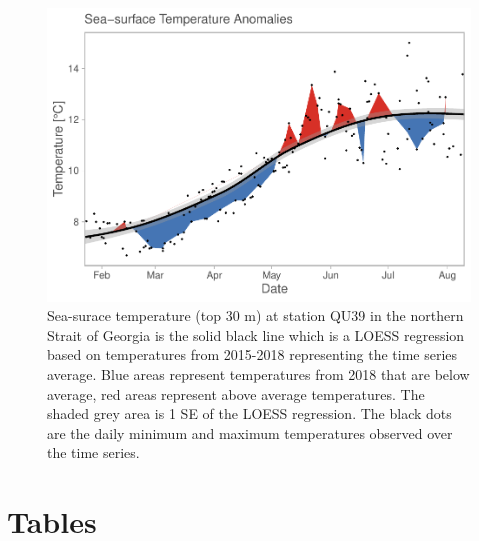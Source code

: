 \documentclass[fleqn,10pt]{wlpeerj} %
\begin{document}
\begin{figure}[H]
\includegraphics[width=0.9\linewidth]{Migration_Observations_Report_files/figure-latex/sst-plot-1} \caption{Sea-surace temperature (top 30 m) at station QU39 in the northern Strait of Georgia is the solid black line which is a LOESS regression based on temperatures from 2015-2018 representing the time series average. Blue areas represent temperatures from 2018 that are below average, red areas represent above average temperatures. The shaded grey area is 1 SE of the LOESS regression. The black dots are the daily minimum and maximum temperatures observed over the time series.}\label{fig:sst-plot}
\end{figure}

\hypertarget{tables}{%
\section{Tables}\label{tables}}
\end{document}
